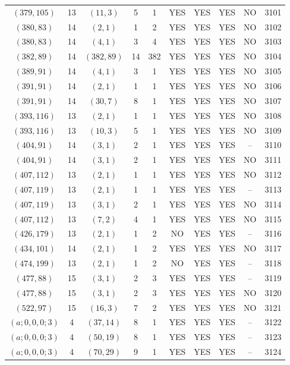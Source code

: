 \begin{longtable}{|c|c|c|c|c|c|c|c|c|c|}
$(379, 105)$ & 13 & $(11, 3)$ & 5 & 1 & YES & YES & YES & NO & 3101\\
$(380, 83)$ & 14 & $(2, 1)$ & 1 & 2 & YES & YES & YES & NO & 3102\\
$(380, 83)$ & 14 & $(4, 1)$ & 3 & 4 & YES & YES & YES & NO & 3103\\
$(382, 89)$ & 14 & $(382, 89)$ & 14 & 382 & YES & YES & YES & NO & 3104\\
$(389, 91)$ & 14 & $(4, 1)$ & 3 & 1 & YES & YES & YES & NO & 3105\\
$(391, 91)$ & 14 & $(2, 1)$ & 1 & 1 & YES & YES & YES & NO & 3106\\
$(391, 91)$ & 14 & $(30, 7)$ & 8 & 1 & YES & YES & YES & NO & 3107\\
$(393, 116)$ & 13 & $(2, 1)$ & 1 & 1 & YES & YES & YES & NO & 3108\\
$(393, 116)$ & 13 & $(10, 3)$ & 5 & 1 & YES & YES & YES & NO & 3109\\
$(404, 91)$ & 14 & $(3, 1)$ & 2 & 1 & YES & YES & YES & -- & 3110\\
$(404, 91)$ & 14 & $(3, 1)$ & 2 & 1 & YES & YES & YES & NO & 3111\\
$(407, 112)$ & 13 & $(2, 1)$ & 1 & 1 & YES & YES & YES & NO & 3112\\
$(407, 119)$ & 13 & $(2, 1)$ & 1 & 1 & YES & YES & YES & -- & 3113\\
$(407, 119)$ & 13 & $(3, 1)$ & 2 & 1 & YES & YES & YES & NO & 3114\\
$(407, 112)$ & 13 & $(7, 2)$ & 4 & 1 & YES & YES & YES & NO & 3115\\
$(426, 179)$ & 13 & $(2, 1)$ & 1 & 2 & NO & YES & YES & -- & 3116\\
$(434, 101)$ & 14 & $(2, 1)$ & 1 & 2 & YES & YES & YES & NO & 3117\\
$(474, 199)$ & 13 & $(2, 1)$ & 1 & 2 & NO & YES & YES & -- & 3118\\
$(477, 88)$ & 15 & $(3, 1)$ & 2 & 3 & YES & YES & YES & -- & 3119\\
$(477, 88)$ & 15 & $(3, 1)$ & 2 & 3 & YES & YES & YES & NO & 3120\\
$(522, 97)$ & 15 & $(16, 3)$ & 7 & 2 & YES & YES & YES & NO & 3121\\
$(a; 0, 0, 0; 3)$ & 4 & $(37, 14)$ & 8 & 1 & YES & YES & YES & -- & 3122\\
$(a; 0, 0, 0; 3)$ & 4 & $(50, 19)$ & 8 & 1 & YES & YES & YES & -- & 3123\\
$(a; 0, 0, 0; 3)$ & 4 & $(70, 29)$ & 9 & 1 & YES & YES & YES & -- & 3124\\

\end{longtable}
